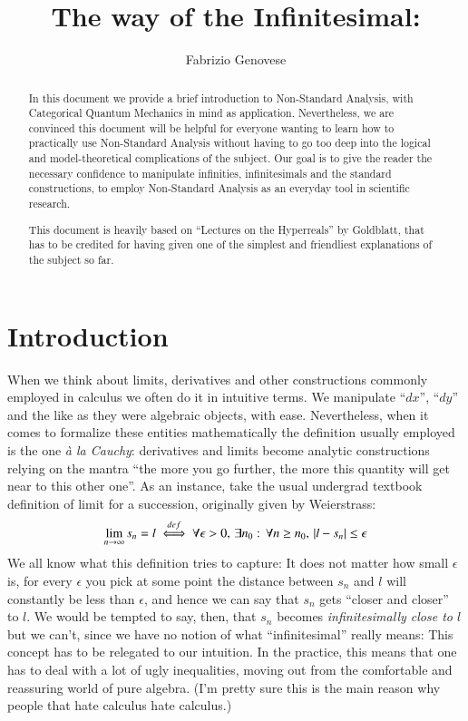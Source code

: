 \documentclass[adraft, copyright,creativecommons,sharealike,noncommercial]{Preambles/eptcs}
\title{The way of the Infinitesimal: }
\author{
	Fabrizio Genovese
	\institute{Quantum Group \\ University of Oxford}
	\email{fabrizio.genovese@hertford.ox.ac.uk}
}
\begin{document}


\maketitle


\begin{abstract}
In this document we provide a brief introduction to Non-Standard Analysis, with Categorical Quantum Mechanics in mind as application. Nevertheless, we are convinced this document will be helpful for everyone wanting to learn how to practically use Non-Standard Analysis without having to go too deep into the logical and model-theoretical complications of the subject. Our goal is to give the reader the necessary confidence to manipulate infinities, infinitesimals and the standard constructions, to employ Non-Standard Analysis as an everyday tool in scientific research.

This document is heavily based on ``Lectures on the Hyperreals'' by Goldblatt, that has to be credited for having given one of the simplest and friendliest explanations of the subject so far.
\end{abstract}

\section{Introduction} 
When we think about limits, derivatives and other constructions commonly employed in calculus we often do it in intuitive terms. We manipulate ``$dx$'', ``$dy$'' and the like as they were algebraic objects, with ease. Nevertheless, when it comes to formalize these entities mathematically the definition usually employed is the one \emph{\`a la Cauchy}: derivatives and limits become analytic constructions relying on the mantra ``the more you go further, the more this quantity will get near to this other one''. As an instance, take the usual undergrad textbook definition of limit for a succession, originally given by Weierstrass:
\begin{equation*}
	\lim_{n \to \infty} s_n = l \stackrel{def}{\iff} \forall \epsilon > 0, \, \exists n_0: \, \forall n \geq n_0, \, |l - s_n| \leq \epsilon
\end{equation*}
We all know what this definition tries to capture: It does not matter how small $\epsilon$ is, for every $\epsilon$ you pick at some point the distance between $s_n$ and $l$ will constantly be less than $\epsilon$, and hence we can say that $s_n$ gets ``closer and closer'' to $l$. We would be tempted to say, then, that $s_n$ becomes \emph{infinitesimally close to $l$} but we can't, since we have no notion of what ``infinitesimal'' really means: This concept has to be relegated to our intuition. In the practice, this means that one has to deal with a lot of ugly inequalities, moving out from the comfortable and reassuring world of pure algebra. (I'm pretty sure this is the main reason why people that hate calculus hate calculus.)
\end{document}
